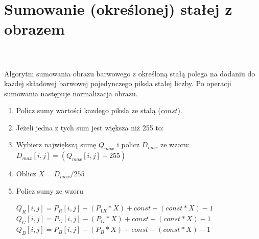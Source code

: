 \documentclass[final,a4paper,openany,12pt]{mwbk}
\begin{document}
\section{Sumowanie (określonej) stałej z obrazem}
\hfill
\\\\
\indent
Algorytm sumowania obrazu barwowego z określoną stałą polega na dodaniu do każdej składowej barwowej pojedynczego piksla stałej liczby.
Po operacji sumowania następuje normalizacja obrazu.

	\begin{enumerate}	
		\item Policz sumy wartości kazdego piksla ze stałą ($const$).
		\item Jeżeli jedna z tych sum jest większa niż 255 to:
		\item Wybierz największą sumę  $Q_{max}$ i policz $D_{max}$ ze wzoru: $D_{max}[i,j] = (Q_{max}[i,j] - 255)$ 
		\item Oblicz $X = D_{max} / 255$
		\item Policz sumy ze wzoru
		\begin{center}$Q_{R}[i,j] = P_{R}[i,j] - (P_{1R} * X)+ const - (const * X) -1$ \\
			$Q_{G}[i,j] = P_{G}[i,j] - (P_{G} * X)+ const - (const * X) -1$ \\
			$Q_{B}[i,j] = P_{B}[i,j] - (P_{B} * X)+ const - (const * X) -1$
		\end{center}
	\end{enumerate}
\end{document}
